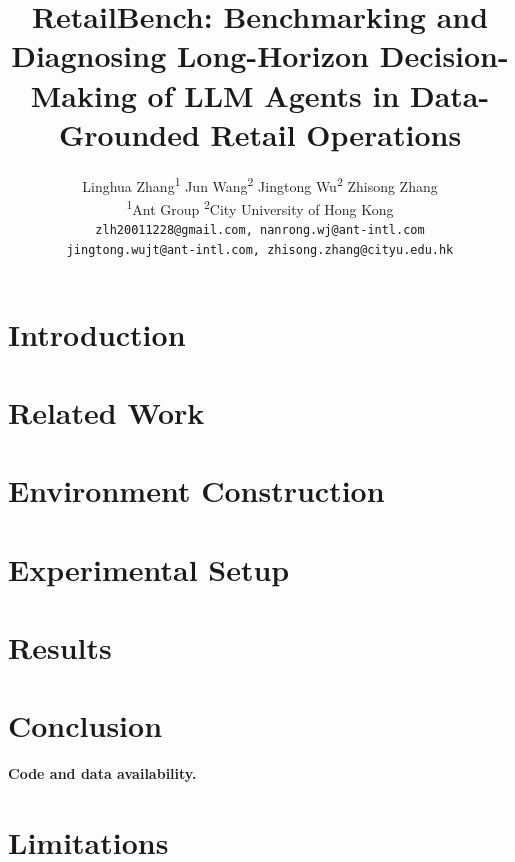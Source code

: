 \documentclass[11pt]{article}
\title{RetailBench: Benchmarking and Diagnosing Long-Horizon Decision-Making of LLM Agents in Data-Grounded Retail Operations}
\author{
Linghua Zhang\textsuperscript{1}
\quad
Jun Wang\textsuperscript{2}
\quad
Jingtong Wu\textsuperscript{2}
\quad
Zhisong Zhang\textsuperscript{\dag} \\
\textsuperscript{1}Ant Group
\quad
\textsuperscript{2}City University of Hong Kong \\
\texttt{zlh20011228@gmail.com, nanrong.wj@ant-intl.com} \\
\texttt{jingtong.wujt@ant-intl.com, zhisong.zhang@cityu.edu.hk}
}
\begin{document}
\maketitle
\begin{abstract}

\end{abstract}

\section{Introduction}
\label{sec:intro}


\section{Related Work}
\label{sec:related_work}


\section{Environment Construction}
\label{sec:env}


\section{Experimental Setup}
\label{sec:evaluation_protocol}


\section{Results}
\label{sec:experiment}


\section{Conclusion}
\label{sec:conclusion}


\noindent\textbf{Code and data availability.}


\section{Limitations}
\label{sec:limitation}


%


\appendix



\end{document}
